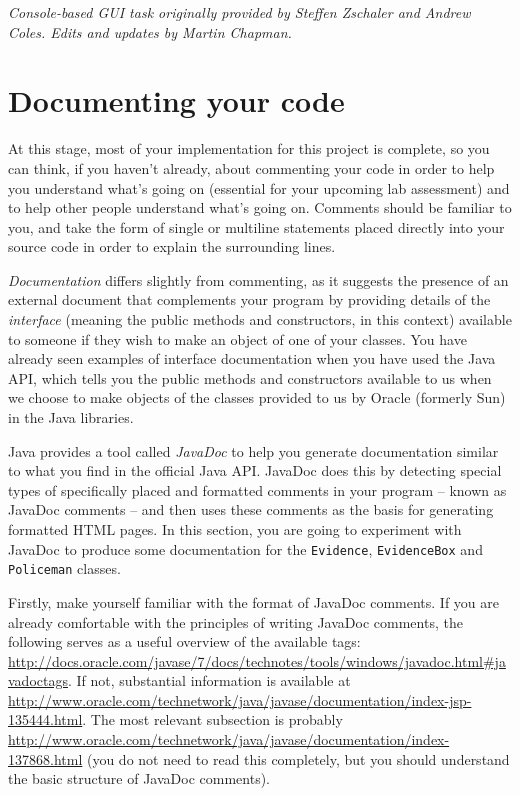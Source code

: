 \documentclass[11pt]{article}
\begin{document}
\emph{Console-based GUI task originally provided by Steffen Zschaler and Andrew Coles. Edits and updates by Martin Chapman.}

\section{Documenting your code}

At this stage, most of your implementation for this project is complete, so you can think, if you haven't already, about commenting your code in order to help you understand what's going on (essential for your upcoming lab assessment) and to help other people understand what's going on. Comments should be familiar to you, and take the form of single or multiline statements placed directly into your source code in order to explain the surrounding lines.

\emph{Documentation} differs slightly from commenting, as it suggests the presence of an external document that complements your program by providing details of the \emph{interface} (meaning the public methods and constructors, in this context) available to someone if they wish to make an object of one of your classes. You have already seen examples of interface documentation when you have used the Java API, which tells you the public methods and constructors available to us when we choose to make objects of the classes provided to us by Oracle (formerly Sun) in the Java libraries. 

Java provides a tool called \emph{JavaDoc} to help you generate documentation similar to what you find in the official Java API. JavaDoc does this by detecting special types of specifically placed and formatted comments in your program -- known as JavaDoc comments -- and then uses these comments as the basis for generating formatted HTML pages. In this section, you are going to experiment with JavaDoc to produce some documentation for the \texttt{Evidence}, \texttt{EvidenceBox} and \texttt{Policeman} classes.

Firstly, make yourself familiar with the format of JavaDoc comments. If you are already comfortable with the principles of writing JavaDoc comments, the following serves as a useful overview of the available tags: \url{http://docs.oracle.com/javase/7/docs/technotes/tools/windows/javadoc.html#javadoctags}. If not, substantial information is available at \url{http://www.oracle.com/technetwork/java/javase/documentation/index-jsp-135444.html}. The most relevant subsection is probably \url{http://www.oracle.com/technetwork/java/javase/documentation/index-137868.html} (you do not need to read this completely, but you should understand the basic structure of JavaDoc comments).
		
\end{document}

